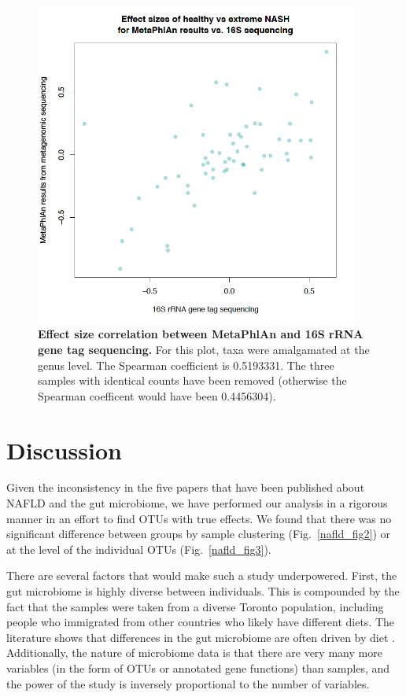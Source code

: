 \begin{figure}[h]
\begin{center}
\includegraphics[width=0.95\textwidth]{metaphlan_16s_effects.png}
\caption{\textbf{Effect size correlation between MetaPhlAn and 16S rRNA gene tag sequencing.} For this plot, taxa were amalgamated at the genus level. The Spearman coefficient is 0.5193331. The three samples with identical counts have been removed (otherwise the Spearman coefficent would have been 0.4456304).}
\end{center}
\label{nafld_metaphlan_effect}
\end{figure}

\FloatBarrier

\section{Discussion}

Given the inconsistency in the five papers that have been published about NAFLD and the gut microbiome, we have performed our analysis in a rigorous manner in an effort to find OTUs with true effects. We found that there was no significant difference between groups by sample clustering (Fig.~\ref{nafld_fig2}) or at the level of the individual OTUs (Fig.~\ref{nafld_fig3}).

There are several factors that would make such a study underpowered. First, the gut microbiome is highly diverse between individuals. This is compounded by the fact that the samples were taken from a diverse Toronto population, including people who immigrated from other countries who likely have different diets. The literature shows that differences in the gut microbiome are often driven by diet \cite{david2014diet}. Additionally, the nature of microbiome data is that there are very many more variables (in the form of OTUs or annotated gene functions) than samples, and the power of the study is inversely proportional to the number of variables.

